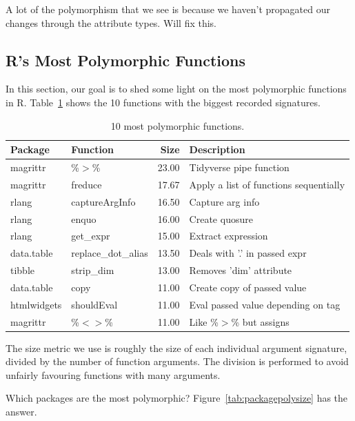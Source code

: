 \documentclass[acmsmall,10pt,review,anonymous]{acmart}\settopmatter{printfolios=true,printccs=false,printacmref=false}
\begin{document}
A lot of the polymorphism that we see is because we haven't propagated our changes through the attribute types.
Will fix this.

%
%
%
%
\subsection{R's Most Polymorphic Functions}


In this section, our goal is to shed some light on the most polymorphic functions in R.
Table~\ref{tab:bigpolyfuns} shows the 10 functions with the biggest recorded signatures.

\begin{table}[ht]
\label{tab:bigpolyfuns}
\centering
\begin{tabular}{llrl}
  \hline
Package & Function & Size & Description \\ 
  \hline
magrittr & \%$>$\% & 23.00 & Tidyverse pipe function \\ 
  magrittr & freduce & 17.67 & Apply a list of functions sequentially \\ 
  rlang & captureArgInfo & 16.50 & Capture arg info \\ 
  rlang & enquo & 16.00 & Create quosure \\ 
  rlang & get\_expr & 15.00 & Extract expression \\ 
  data.table & replace\_dot\_alias & 13.50 & Deals with '.' in passed expr \\ 
  tibble & strip\_dim & 13.00 & Removes 'dim' attribute \\ 
  data.table & copy & 11.00 & Create copy of passed value \\ 
  htmlwidgets & shouldEval & 11.00 & Eval passed value depending on tag \\ 
  magrittr & \%$<$$>$\% & 11.00 & Like \%$>$\% but assigns \\ 
   \hline
\end{tabular}
\caption{10 most polymorphic functions.}
\end{table}

The size metric we use is roughly the size of each individual argument signature, divided by the number of function arguments.
The division is performed to avoid unfairly favouring functions with many arguments.

Which packages are the most polymorphic?
Figure~\ref{tab:packagepolysize} has the answer.
\end{document}
